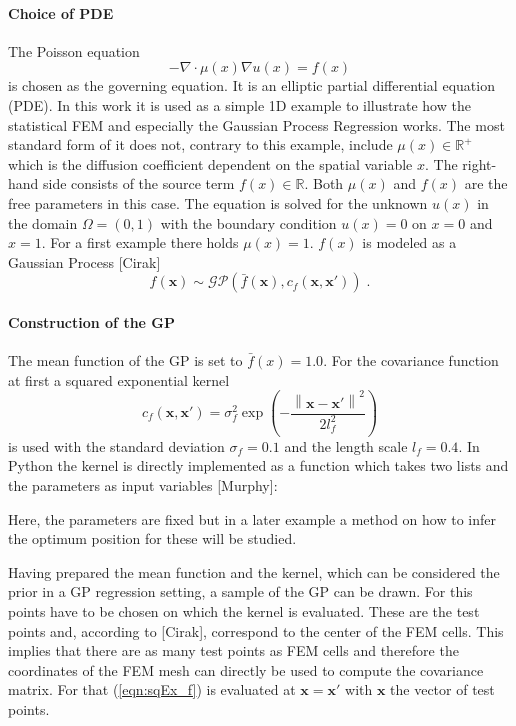\documentclass[%
  a4paper,oneside,%
  11pt,%
  smallchapters,
  green,%
  rgb, <cmyk>
  ]{tubsbook}
\begin{document}
\paragraph{Choice of PDE}
The Poisson equation 
\begin{equation}
- \nabla \cdot \mu(x) \nabla u(x) = f(x)
\label{eqn:Poisson}
\end{equation}
is chosen as the governing equation. It is an elliptic partial differential equation (PDE). In this work it is used as a simple 1D example to illustrate how the statistical FEM and especially the Gaussian Process Regression works.
The most standard form of it does not, contrary to this example, include $\mu(x) \in \mathbb{R}^+$ which is the diffusion coefficient dependent on the spatial variable $x$. The right-hand side consists of the source term $f(x)\in \mathbb{R}$. Both $\mu (x)$ and $f(x)$ are the free parameters in this case. The equation is solved for the unknown  $u(x)$ in the domain $\Omega = (0,1)$ with the boundary condition $u(x) = 0$ on $x=0$ and $x=1$.
%
For a first example there holds $\mu(x)=1$. $f(x)$ is modeled as a Gaussian Process [Cirak]
%
\begin{equation}
f(\bm{x}) \sim \mathcal{GP} \left( \bar{f}(\bm{x}), c_f(\bm{x},\bm{x}')\right) \;.
\end{equation}
%
\paragraph{Construction of the GP}
The mean function of the GP is set to $\bar{f}(x) = 1.0$. For the covariance function at first a squared exponential kernel 
%
\begin{equation}
c_f(\bm{x},\bm{x}') =    \sigma_{f}^2 \exp \left(-  \frac{\left \| \bm{x}-{\bm{x}}' \right \|^2}{2l_{f}^2} \right )       
\label{eqn:sqEx_f}
\end{equation}
%
is used with the standard deviation $\sigma_{f} = 0.1$ and the length scale $l_{f} = 0.4$.
In Python the kernel is directly implemented as a function which takes two lists and the parameters as input variables [Murphy]:

%
Here, the parameters are fixed but in a later example a method on how to infer the optimum position for these will be studied.

Having prepared the mean function and the kernel, which can be considered the prior in a GP regression setting, a sample of the GP can be drawn. For this points have to be chosen on which the kernel is evaluated. These are the test points and, according to [Cirak], correspond to the center of the FEM cells. This implies that there are as many test points as FEM cells and therefore the coordinates of the FEM mesh can directly be used to compute the covariance matrix. For that (\ref{eqn:sqEx_f}) is evaluated at $\bm{x} = \bm{x}'$ with $\bm{x}$ the vector of test points. 
\end{document}
